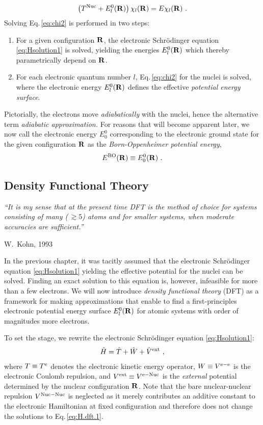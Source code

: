 \documentclass[a4paper,12pt]{book}
\begin{document}
\begin{align}
    \left( T^{\rm Nuc} + E^0_l({\bf R}) \right) \chi_l ({\bf R})
        = E \chi_l ({\bf R})~.
    \label{eq:chi2}
\end{align}
Solving Eq.\,\eqref{eq:chi2} is performed in two steps:
\begin{enumerate}
    \item For a given configuration $\bf R$, the electronic Schr\"odinger equation \eqref{eq:Hsolution1} is solved, yielding the energies $E^0_l({\bf R})$ which thereby parametrically depend on $\bf R$.
    \item For each electronic quantum number $l$, Eq.\,\eqref{eq:chi2} for the nuclei is solved, where the electronic energy $E^0_l({\bf R})$ defines the effective \emph{potential energy surface}.
\end{enumerate}
Pictorially, the electrons move \emph{adiabatically} with the nuclei, hence the alternative term \emph{adiabatic approximation.} For reasons that will become apparent later, we now call the electronic energy $E^0_0$ corresponding to the electronic ground state for the given configuration ${\bf R}$ as the \emph{Born-Oppenheimer potential energy},
\begin{align}
	E^{\rm BO} ({\bf R}) \equiv E^0_0 ({\bf R})~.
	\label{eq:E^BO}
\end{align}

\subsection{Density Functional Theory}
\epigraph{\singlespacing \it ``It is my sense that at the present time DFT is the method of choice for systems consisting of many (\,$\gtrsim 5$) atoms and for smaller systems, when moderate accuracies are sufficient.''}{W.~Kohn, 1993}

In the previous chapter, it was tacitly assumed that the electronic Schr\"odinger equation \eqref{eq:Hsolution1} yielding the effective potential for the nuclei can be solved. Finding an exact solution to this equation is, however, infeasible for more than a few electrons. We will now introduce \emph{density functional theory} (DFT) as a framework for making approximations that enable to find a first-principles electronic potential energy surface $E^0_l ({\bf R})$ for atomic systems with order of magnitudes more electrons.

To set the stage, we rewrite the electronic Schr\"odinger equation \eqref{eq:Hsolution1}:
\begin{align}
	\hat H = \hat T + \hat W + \hat V^{\rm ext}~,
	\label{eq:H.dft.1}
\end{align}
where $T \equiv T^{\rm e}$ denotes the electronic kinetic energy operator, $W \equiv V^{\rm e-e}$ is the electronic Coulomb repulsion, and $V^{\rm ext} \equiv V^{\rm e-Nuc}$ is the \emph{external} potential determined by the nuclear configuration $\bf R$. Note that the bare nuclear-nuclear repulsion $V^{\rm Nuc-Nuc}$ is neglected as it merely contributes an additive constant to the electronic Hamiltonian at fixed configuration and therefore does not change the solutions to Eq.\,\eqref{eq:H.dft.1}.
\end{document}
